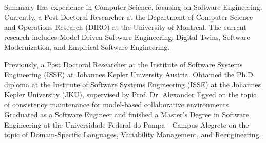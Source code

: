 \prefix{}
\begin{rubric}{Summary}
\entry*[]
Has experience in Computer Science, focusing on Software Engineering. Currently, a Post Doctoral Researcher at the Department of Computer Science and Operations Research (DIRO) at the University of Montreal. The current research includes Model-Driven Software Engineering, Digital Twins, Software Modernization, and Empirical Software Engineering.

Previously, a Post Doctoral Researcher at the Institute of Software Systems Engineering (ISSE) at Johannes Kepler University Austria. Obtained the Ph.D. diploma at the Institute of Software Systems Engineering (ISSE) at the Johannes Kepler University (JKU), supervised by Prof. Dr. Alexander Egyed on the topic of consistency maintenance for model-based collaborative environments. Graduated as a Software Engineer and finished a Master's Degree in Software Engineering at the Universidade Federal do Pampa - Campus Alegrete on the topic of Domain-Specific Languages, Variability Management, and Reengineering.




\end{rubric}